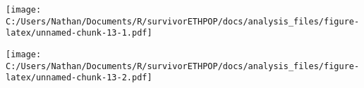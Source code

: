 \documentclass[
]{article}
\newenvironment{Shaded}{\begin{snugshade}}{\end{snugshade}}
\newcommand{\DataTypeTok}[1]{\textcolor[rgb]{0.13,0.29,0.53}{#1}}
\newcommand{\KeywordTok}[1]{\textcolor[rgb]{0.13,0.29,0.53}{\textbf{#1}}}
\newcommand{\NormalTok}[1]{#1}
\newcommand{\OperatorTok}[1]{\textcolor[rgb]{0.81,0.36,0.00}{\textbf{#1}}}
\newcommand{\StringTok}[1]{\textcolor[rgb]{0.31,0.60,0.02}{#1}}
\begin{document}
\texttt{[image: C:/Users/Nathan/Documents/R/survivorETHPOP/docs/analysis\_files/figure-latex/unnamed-chunk-13-1.pdf]}

\begin{Shaded}
\end{Shaded}

\texttt{[image: C:/Users/Nathan/Documents/R/survivorETHPOP/docs/analysis\_files/figure-latex/unnamed-chunk-13-2.pdf]}
\end{document}
